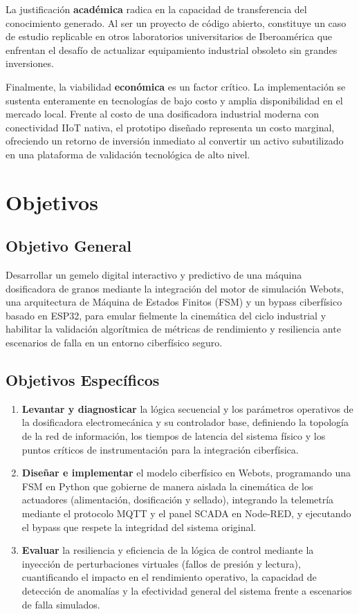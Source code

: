 La justificación \textbf{académica} radica en la capacidad de transferencia del conocimiento generado. Al ser un proyecto de código abierto, constituye un caso de estudio replicable en otros laboratorios universitarios de Iberoamérica que enfrentan el desafío de actualizar equipamiento industrial obsoleto sin grandes inversiones.

Finalmente, la viabilidad \textbf{económica} es un factor crítico. La implementación se sustenta enteramente en tecnologías de bajo costo y amplia disponibilidad en el mercado local. Frente al costo de una dosificadora industrial moderna con conectividad IIoT nativa, el prototipo diseñado representa un costo marginal, ofreciendo un retorno de inversión inmediato al convertir un activo subutilizado en una plataforma de validación tecnológica de alto nivel.

\section{Objetivos}

\subsection{Objetivo General}
Desarrollar un gemelo digital interactivo y predictivo de una máquina dosificadora de granos mediante la integración del motor de simulación Webots, una arquitectura de Máquina de Estados Finitos (FSM) y un bypass ciberfísico basado en ESP32, para emular fielmente la cinemática del ciclo industrial y habilitar la validación algorítmica de métricas de rendimiento y resiliencia ante escenarios de falla en un entorno ciberfísico seguro.

\subsection{Objetivos Específicos}
\begin{enumerate}
  \item \textbf{Levantar y diagnosticar} la lógica secuencial y los parámetros operativos de la dosificadora electromecánica y su controlador base, definiendo la topología de la red de información, los tiempos de latencia del sistema físico y los puntos críticos de instrumentación para la integración ciberfísica.
  \item \textbf{Diseñar e implementar} el modelo ciberfísico en Webots, programando una FSM en Python que gobierne de manera aislada la cinemática de los actuadores (alimentación, dosificación y sellado), integrando la telemetría mediante el protocolo MQTT y el panel SCADA en Node-RED, y ejecutando el bypass que respete la integridad del sistema original.
  \item \textbf{Evaluar} la resiliencia y eficiencia de la lógica de control mediante la inyección de perturbaciones virtuales (fallos de presión y lectura), cuantificando el impacto en el rendimiento operativo, la capacidad de detección de anomalías y la efectividad general del sistema frente a escenarios de falla simulados.
\end{enumerate}

